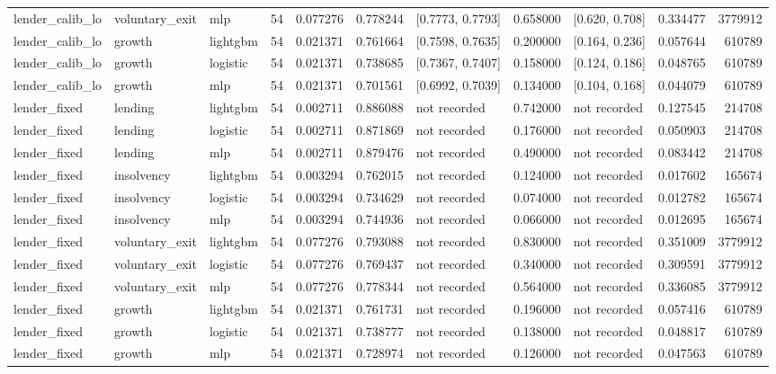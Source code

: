 \begin{table}
{\begin{tabular}{lllrrrlrlrr}
lender_calib_lo & voluntary_exit & mlp & 54 & 0.077276 & 0.778244 & [0.7773, 0.7793] & 0.658000 & [0.620, 0.708] & 0.334477 & 3779912 \\
lender_calib_lo & growth & lightgbm & 54 & 0.021371 & 0.761664 & [0.7598, 0.7635] & 0.200000 & [0.164, 0.236] & 0.057644 & 610789 \\
lender_calib_lo & growth & logistic & 54 & 0.021371 & 0.738685 & [0.7367, 0.7407] & 0.158000 & [0.124, 0.186] & 0.048765 & 610789 \\
lender_calib_lo & growth & mlp & 54 & 0.021371 & 0.701561 & [0.6992, 0.7039] & 0.134000 & [0.104, 0.168] & 0.044079 & 610789 \\
lender_fixed & lending & lightgbm & 54 & 0.002711 & 0.886088 & not recorded & 0.742000 & not recorded & 0.127545 & 214708 \\
lender_fixed & lending & logistic & 54 & 0.002711 & 0.871869 & not recorded & 0.176000 & not recorded & 0.050903 & 214708 \\
lender_fixed & lending & mlp & 54 & 0.002711 & 0.879476 & not recorded & 0.490000 & not recorded & 0.083442 & 214708 \\
lender_fixed & insolvency & lightgbm & 54 & 0.003294 & 0.762015 & not recorded & 0.124000 & not recorded & 0.017602 & 165674 \\
lender_fixed & insolvency & logistic & 54 & 0.003294 & 0.734629 & not recorded & 0.074000 & not recorded & 0.012782 & 165674 \\
lender_fixed & insolvency & mlp & 54 & 0.003294 & 0.744936 & not recorded & 0.066000 & not recorded & 0.012695 & 165674 \\
lender_fixed & voluntary_exit & lightgbm & 54 & 0.077276 & 0.793088 & not recorded & 0.830000 & not recorded & 0.351009 & 3779912 \\
lender_fixed & voluntary_exit & logistic & 54 & 0.077276 & 0.769437 & not recorded & 0.340000 & not recorded & 0.309591 & 3779912 \\
lender_fixed & voluntary_exit & mlp & 54 & 0.077276 & 0.778344 & not recorded & 0.564000 & not recorded & 0.336085 & 3779912 \\
lender_fixed & growth & lightgbm & 54 & 0.021371 & 0.761731 & not recorded & 0.196000 & not recorded & 0.057416 & 610789 \\
lender_fixed & growth & logistic & 54 & 0.021371 & 0.738777 & not recorded & 0.138000 & not recorded & 0.048817 & 610789 \\
lender_fixed & growth & mlp & 54 & 0.021371 & 0.728974 & not recorded & 0.126000 & not recorded & 0.047563 & 610789 \\

\end{tabular}}
\end{table}
